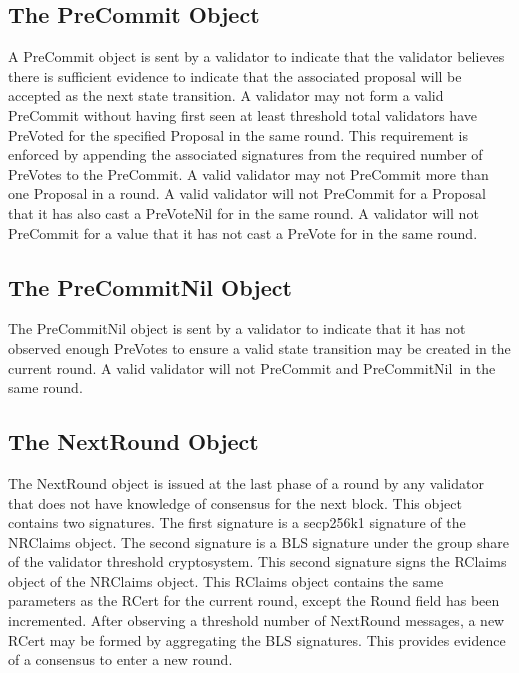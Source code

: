 \subsection{The PreCommit Object}



A PreCommit object is sent by a validator to indicate that the
validator believes there is sufficient evidence to indicate that the
associated proposal will be accepted as the next state transition.
A validator may not form a valid PreCommit without having first seen at
least threshold total validators have PreVoted for the specified
Proposal in the same round.
This requirement is enforced by appending the associated signatures
from the required number of PreVotes to the PreCommit.
A valid validator may not PreCommit more than one Proposal in a round.
A valid validator will not PreCommit for a Proposal that it has also
cast a PreVoteNil for in the same round.
A validator will not PreCommit for a value that it has not cast a
PreVote for in the same round.

\subsection{The PreCommitNil Object}



The PreCommitNil object is sent by a validator to indicate that it has
not observed enough PreVotes to ensure a valid state transition may be
created in the current round.
A valid validator will not PreCommit and PreCommitNil\ in the same
round.


\subsection{The NextRound Object}



The NextRound object is issued at the last phase of a round by any
validator that does not have knowledge of consensus for the next block.
This object contains two signatures.
The first signature is a secp256k1 signature of the NRClaims object.
The second signature is a BLS signature under the group share of the
validator threshold cryptosystem.
This second signature signs the RClaims object of the NRClaims object.
This RClaims object contains the same parameters as the RCert for the
current round, except the Round field has been incremented.
After observing a threshold number of NextRound messages, a new RCert
may be formed by aggregating the BLS signatures.
This provides evidence of a consensus to enter a new round.


